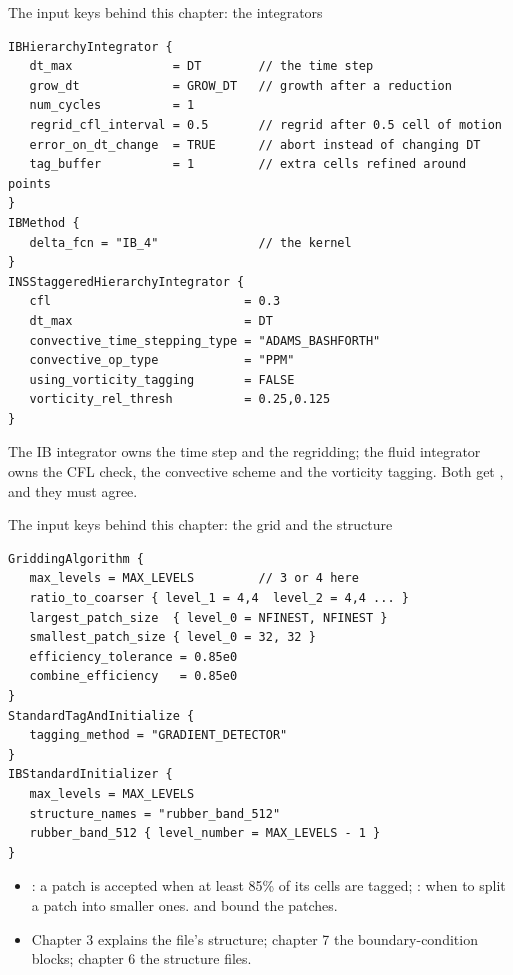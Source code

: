 \documentclass[aspectratio=169,11pt]{beamer}
\begin{document}
\begin{frame}[fragile]{The input keys behind this chapter: the integrators}
\begin{lstlisting}[style=input,basicstyle=\ttfamily\scriptsize\color{BlackGray}]
IBHierarchyIntegrator {
   dt_max              = DT        // the time step
   grow_dt             = GROW_DT   // growth after a reduction
   num_cycles          = 1
   regrid_cfl_interval = 0.5       // regrid after 0.5 cell of motion
   error_on_dt_change  = TRUE      // abort instead of changing DT
   tag_buffer          = 1         // extra cells refined around points
}
IBMethod {
   delta_fcn = "IB_4"              // the kernel
}
INSStaggeredHierarchyIntegrator {
   cfl                           = 0.3
   dt_max                        = DT
   convective_time_stepping_type = "ADAMS_BASHFORTH"
   convective_op_type            = "PPM"
   using_vorticity_tagging       = FALSE
   vorticity_rel_thresh          = 0.25,0.125
}
\end{lstlisting}
\small The IB integrator owns the time step and the regridding; the fluid integrator owns the CFL check, the convective scheme and the vorticity tagging. Both get , and they must agree.
\end{frame}

\begin{frame}[fragile]{The input keys behind this chapter: the grid and the structure}
\begin{lstlisting}[style=input,basicstyle=\ttfamily\tiny\color{BlackGray}]
GriddingAlgorithm {
   max_levels = MAX_LEVELS         // 3 or 4 here
   ratio_to_coarser { level_1 = 4,4  level_2 = 4,4 ... }
   largest_patch_size  { level_0 = NFINEST, NFINEST }
   smallest_patch_size { level_0 = 32, 32 }
   efficiency_tolerance = 0.85e0
   combine_efficiency   = 0.85e0
}
StandardTagAndInitialize {
   tagging_method = "GRADIENT_DETECTOR"
}
IBStandardInitializer {
   max_levels = MAX_LEVELS
   structure_names = "rubber_band_512"
   rubber_band_512 { level_number = MAX_LEVELS - 1 }
}
\end{lstlisting}
\small
\begin{itemize}
  \item {}: a patch is accepted when at least 85\% of its cells are tagged; : when to split a patch into smaller ones.  and  bound the patches.
  \item Chapter 3 explains the file's structure; chapter 7 the boundary-condition blocks; chapter 6 the structure files.
\end{itemize}
\end{frame}
\end{document}
